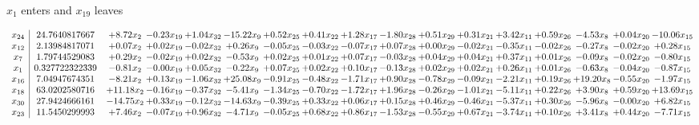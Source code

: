 \documentclass[9pt]{article}
\begin{document}
 $ x_{1} $ enters and $ x_{19} $ leaves 

 \[\begin{array}{c| c c@{\hskip 2pt} c@{\hskip 2pt} c@{\hskip 2pt} c@{\hskip 2pt} c@{\hskip 2pt} c@{\hskip 2pt} c@{\hskip 2pt} c@{\hskip 2pt} c@{\hskip 2pt} c@{\hskip 2pt} c@{\hskip 2pt} c@{\hskip 2pt} c@{\hskip 2pt} c@{\hskip 2pt} c@{\hskip 2pt} }
 x_{24}   &  24.7640817667 & +  8.72 x_{2} & -0.23 x_{19} & +  1.04 x_{32} & -15.22 x_{9} & +  0.52 x_{25} & +  0.41 x_{22} & +  1.28 x_{17} & -1.80 x_{28} & +  0.51 x_{29} & +  0.31 x_{21} & +  3.42 x_{11} & +  0.59 x_{26} & -4.53 x_{8} & +  0.04 x_{20} & -10.06 x_{15}\\
 x_{12}   &  2.13984817071 & +  0.07 x_{2} & +  0.02 x_{19} & -0.02 x_{32} & +  0.26 x_{9} & -0.05 x_{25} & -0.03 x_{22} & -0.07 x_{17} & +  0.07 x_{28} & +  0.00 x_{29} & -0.02 x_{21} & -0.35 x_{11} & -0.02 x_{26} & -0.27 x_{8} & -0.02 x_{20} & +  0.28 x_{15}\\
 x_{7}   &  1.79744529083 & +  0.29 x_{2} & -0.02 x_{19} & +  0.02 x_{32} & -0.53 x_{9} & +  0.02 x_{25} & +  0.01 x_{22} & +  0.07 x_{17} & -0.03 x_{28} & +  0.04 x_{29} & +  0.04 x_{21} & +  0.37 x_{11} & +  0.01 x_{26} & -0.09 x_{8} & -0.02 x_{20} & -0.80 x_{15}\\
 x_{1}   &  0.327722322339 & -0.81 x_{2} & -0.00 x_{19} & +  0.05 x_{32} & -0.22 x_{9} & +  0.07 x_{25} & +  0.02 x_{22} & +  0.10 x_{17} & -0.13 x_{28} & +  0.02 x_{29} & +  0.02 x_{21} & +  0.26 x_{11} & +  0.01 x_{26} & -0.63 x_{8} & -0.04 x_{20} & -0.87 x_{15}\\
 x_{16}   &  7.04947674351 & -8.21 x_{2} & +  0.13 x_{19} & -1.06 x_{32} & + 25.08 x_{9} & -0.91 x_{25} & -0.48 x_{22} & -1.71 x_{17} & +  0.90 x_{28} & -0.78 x_{29} & -0.09 x_{21} & -2.21 x_{11} & +  0.19 x_{26} & + 19.20 x_{8} & -0.55 x_{20} & -1.97 x_{15}\\
 x_{18}   &  63.0202580716 & + 11.18 x_{2} & -0.16 x_{19} & -0.37 x_{32} & -5.41 x_{9} & -1.34 x_{25} & -0.70 x_{22} & -1.72 x_{17} & +  1.96 x_{28} & -0.26 x_{29} & -1.01 x_{21} & -5.11 x_{11} & +  0.22 x_{26} & +  3.90 x_{8} & +  0.59 x_{20} & + 13.69 x_{15}\\
 x_{30}   &  27.9424666161 & -14.75 x_{2} & +  0.33 x_{19} & -0.12 x_{32} & -14.63 x_{9} & -0.39 x_{25} & +  0.33 x_{22} & +  0.06 x_{17} & +  0.15 x_{28} & +  0.46 x_{29} & -0.46 x_{21} & -5.37 x_{11} & +  0.30 x_{26} & -5.96 x_{8} & -0.00 x_{20} & +  6.82 x_{15}\\
 x_{23}   &  11.5450299993 & +  7.46 x_{2} & -0.07 x_{19} & +  0.96 x_{32} & -4.71 x_{9} & -0.05 x_{25} & +  0.68 x_{22} & +  0.86 x_{17} & -1.53 x_{28} & -0.55 x_{29} & +  0.67 x_{21} & -3.74 x_{11} & +  0.10 x_{26} & +  3.41 x_{8} & +  0.44 x_{20} & -7.71 x_{15}\\

\end{array}\]
\end{document}
